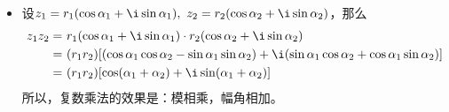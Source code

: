 \begin{itemize}[leftmargin=\inteval{\myitemleftmargin}pt,itemsep=
   \inteval{\myitemitempsep}pt,topsep=\inteval{\myitemtopsep}pt]
\noindent$\left( 1+\dfrac{1}{x}\right)^x,\dfrac{\e^x-1}{x},\dfrac{\sin x}{x} $
三者的图像如下：
\begin{figure}[h]
\centering
\texttt{[image: 两个重要极限图像.pdf]}
\end{figure}\\

\item 设$ z_1=r_1(\cos\alpha_1 +\i\sin\alpha_1),\ 
z_2=r_2(\cos\alpha_2 +\i\sin\alpha_2) $，那么
\begin{align*}
z_1z_2=\ & r_1(\cos\alpha_1+\i\sin\alpha_1)\cdot r_2(\cos
\alpha_2+\i\sin\alpha_2)\\=\ & (r_1r_2)[(\cos\alpha_1\cos\alpha_2-
\sin\alpha_1\sin\alpha_2)+\i(\sin\alpha_1\cos\alpha_2+
\cos\alpha_1\sin\alpha_2)]\\=\ & (r_1r_2)[\cos(\alpha_1+
\alpha_2)+\i\sin(\alpha_1+\alpha_2)]
\end{align*}
所以，复数乘法的效果是：模相乘，幅角相加。


\end{itemize}
